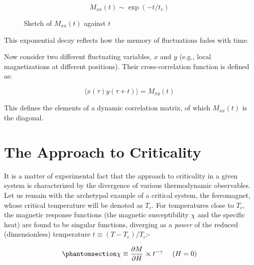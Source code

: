 \documentclass[
  letterpaper,
  enabledeprecatedfontcommands]{report}
\begin{document}
\[
M_{xx}(t) \sim \exp(-t / t_c)
\]

\begin{figure}


\caption{\label{fig-Mxx}Sketch of \(M_{xx}(t)\) against \(t\)}

\end{figure}%

This exponential decay reflects how the memory of fluctuations fades
with time.

Now consider two different fluctuating variables, \(x\) and \(y\) (e.g.,
local magnetizations at different positions). Their cross-correlation
function is defined as:

\[
\langle x(\tau) y(\tau + t) \rangle = M_{xy}(t)
\]

This defines the elements of a dynamic correlation matrix, of which
\(M_{xx}(t)\) is the diagonal.

\chapter{The Approach to Criticality}\label{sec:approach}

It is a matter of experimental fact that the approach to criticality in
a given system is characterized by the divergence of various
thermodynamic observables. Let us remain with the archetypal example of
a critical system, the ferromagnet, whose critical temperature will be
denoted as \(T_c\). For temperatures close to \(T_c\), the magnetic
response functions (the magnetic susceptibility \(\chi\) and the
specific heat) are found to be singular functions, diverging as a
\emph{power} of the reduced (dimensionless) temperature \(t \equiv
(T-T_c)/T_c\):-

\begin{equation}\phantomsection\label{eq-chipow}{
\chi \equiv \frac{\partial M}{\partial H}\propto t^{-\gamma} ~~~~ (H=0) 
}\end{equation}
\end{document}
